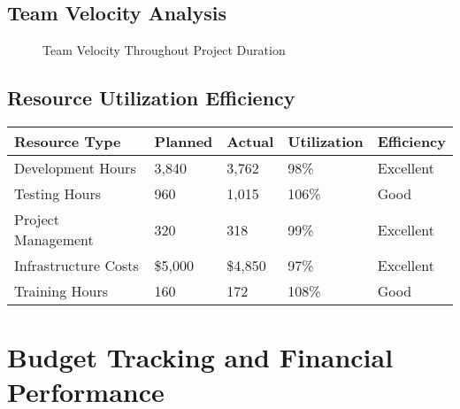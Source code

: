\documentclass[12pt,a4paper]{article}
\begin{document}
\subsection{Team Velocity Analysis}

\begin{figure}[H]
\centering
{}
\caption{Team Velocity Throughout Project Duration}
\label{fig:team-velocity}
\end{figure}

\subsection{Resource Utilization Efficiency}

\begin{longtable}{|p{3cm}|p{2cm}|p{2cm}|p{2cm}|p{3cm}|}
\hline
\textbf{Resource Type} & \textbf{Planned} & \textbf{Actual} & \textbf{Utilization} & \textbf{Efficiency} \\
\hline
Development Hours & 3,840 & 3,762 & 98\% & \cellcolor{completedgreen}Excellent \\
\hline
Testing Hours & 960 & 1,015 & 106\% & \cellcolor{completedgreen}Good \\
\hline
Project Management & 320 & 318 & 99\% & \cellcolor{completedgreen}Excellent \\
\hline
Infrastructure Costs & \$5,000 & \$4,850 & 97\% & \cellcolor{completedgreen}Excellent \\
\hline
Training Hours & 160 & 172 & 108\% & \cellcolor{completedgreen}Good \\
\hline
\end{longtable}

\section{Budget Tracking and Financial Performance}
\end{document}
